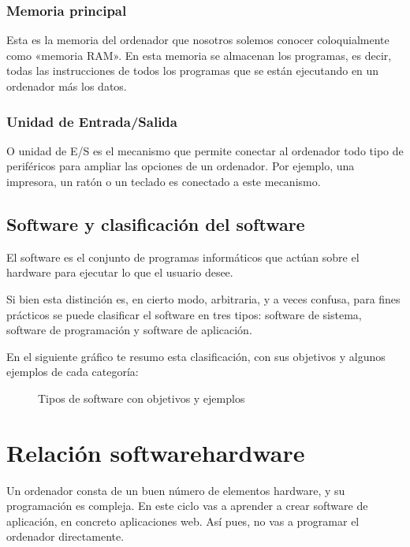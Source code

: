 \documentclass[letterpaper,10pt,spanish]{sphinxmanual}
\begin{document}
\subsection{Memoria principal}
\label{\detokenize{software_hardware:memoria-principal}}
\sphinxAtStartPar
Esta es la memoria del ordenador que nosotros solemos conocer coloquialmente como «memoria RAM». En esta memoria se almacenan los programas, es decir, todas las instrucciones de todos los programas que se están ejecutando en un ordenador más los datos.


\subsection{Unidad de Entrada/Salida}
\label{\detokenize{software_hardware:unidad-de-entrada-salida}}
\sphinxAtStartPar
O unidad de E/S es el mecanismo que permite conectar al ordenador todo tipo de periféricos para ampliar las opciones de un ordenador. Por ejemplo, una impresora, un ratón o un teclado es conectado a este mecanismo.


\section{Software y clasificación del software}
\label{\detokenize{software_hardware:software-y-clasificacion-del-software}}
\sphinxAtStartPar
El software es el conjunto de programas informáticos que actúan sobre el hardware para ejecutar lo que el usuario desee.

\sphinxAtStartPar
Si bien esta distinción es, en cierto modo, arbitraria, y a veces confusa, para fines prácticos se puede clasificar el software en tres tipos: software de sistema, software de programación y software de aplicación.

\sphinxAtStartPar
En el siguiente gráfico te resumo esta clasificación, con sus objetivos y algunos ejemplos de cada categoría:

\begin{figure}[htbp]
\centering
\capstart

\noindent{}
\caption{Tipos de software con objetivos y ejemplos}\label{\detokenize{software_hardware:id3}}\end{figure}

\sphinxstepscope


\chapter{Relación software\sphinxhyphen{}hardware}
\label{\detokenize{relacion_sw_hw:relacion-software-hardware}}\label{\detokenize{relacion_sw_hw::doc}}
\sphinxAtStartPar
Un ordenador consta de un buen número de elementos hardware, y su programación es compleja. En este ciclo vas a aprender a crear software de aplicación, en concreto aplicaciones web. Así pues, no vas a programar el ordenador directamente.
\end{document}

